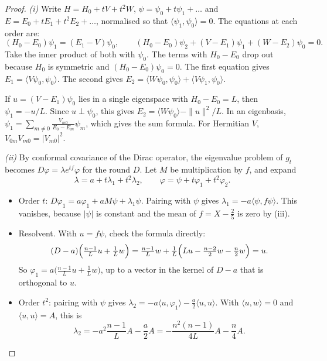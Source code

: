 \begin{proof}
\emph{(i)} Write $H=H_0+tV+t^2W$, $\psi=\psi_0+t\psi_1+\dots$ and $E=E_0+tE_1+t^2E_2+\dots$, normalised so that $\langle\psi_1,\psi_0\rangle=0$. The equations at each order are:
\[
(H_0-E_0)\psi_1=(E_1-V)\psi_0,\qquad(H_0-E_0)\psi_2+(V-E_1)\psi_1+(W-E_2)\psi_0=0 .
\]
Take the inner product of both with $\psi_0$. The terms with $H_0-E_0$ drop out because $H_0$ is symmetric and $(H_0-E_0)\psi_0=0$. The first equation gives $E_1=\langle V\psi_0,\psi_0\rangle$. The second gives $E_2=\langle W\psi_0,\psi_0\rangle+\langle V\psi_1,\psi_0\rangle$.

If $u=(V-E_1)\psi_0$ lies in a single eigenspace with $H_0-E_0=L$, then $\psi_1=-u/L$. Since $u\perp\psi_0$, this gives $E_2=\langle W\psi_0\rangle-\|u\|^2/L$. In an eigenbasis, $\psi_1=\sum_{m\ne0}\frac{V_{m0}}{E_0-E_m}\psi_m$, which gives the sum formula. For Hermitian $V$, $V_{0m}V_{m0}=|V_{m0}|^2$.

\emph{(ii)} By conformal covariance of the Dirac operator, the eigenvalue problem of $g_t$ becomes $D\varphi=\lambda e^{tf}\varphi$ for the round $D$. Let $M$ be multiplication by $f$, and expand
\[
\lambda=a+t\lambda_1+t^2\lambda_2,\qquad\varphi=\psi+t\varphi_1+t^2\varphi_2 .
\]
\begin{itemize}
\item Order $t$: $D\varphi_1=a\varphi_1+aM\psi+\lambda_1\psi$. Pairing with $\psi$ gives $\lambda_1=-a\langle\psi,f\psi\rangle$. This vanishes, because $|\psi|$ is constant and the mean of $f=X-\frac25$ is zero by (iii).
\item Resolvent. With $u=f\psi$, check the formula directly:
\[
(D-a)\Bigl(\tfrac{n-1}Lu+\tfrac1Lw\Bigr)=\tfrac{n-1}Lw+\tfrac1L\Bigl(Lu-\tfrac{n-2}2w-\tfrac n2w\Bigr)=u .
\]
So $\varphi_1=a\bigl(\frac{n-1}Lu+\frac1Lw\bigr)$, up to a vector in the kernel of $D-a$ that is orthogonal to $u$.
\item Order $t^2$: pairing with $\psi$ gives $\lambda_2=-a\langle u,\varphi_1\rangle-\frac a2\langle u,u\rangle$. With $\langle u,w\rangle=0$ and $\langle u,u\rangle=A$, this is
\[
\lambda_2=-a^2\frac{n-1}LA-\frac a2A=-\frac{n^2(n-1)}{4L}A-\frac n4A .
\]
\end{itemize}


\end{proof}
